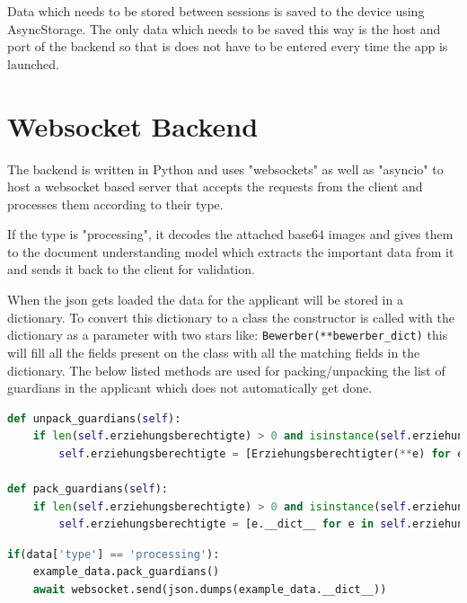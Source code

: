 Data which needs to be stored between sessions is saved to the device using AsyncStorage. The only data which needs to be saved this way is the host and port of the backend so that is does not have to be entered every time the app is launched.

\section{Websocket Backend}

The backend is written in Python and uses "websockets" as well as "asyncio" to host a websocket based server that accepts the requests from the client and processes them according to their type.

If the type is "processing", it decodes the attached base64 images and gives them to the document understanding model which extracts the important data from it and sends it back to the client for validation.

When the json gets loaded the data for the applicant will be stored in a dictionary. To convert this dictionary to a class the constructor is called with the dictionary as a parameter with two stars like: \lstinline{Bewerber(**bewerber_dict)} this will fill all the fields present on the class with all the matching fields in the dictionary. The below listed methods are used for packing/unpacking the list of guardians in the applicant which does not automatically get done.

\begin{lstlisting}[language=Python,caption=Packing of Guardians]
def unpack_guardians(self):
    if len(self.erziehungsberechtigte) > 0 and isinstance(self.erziehungsberechtigte[0], dict):
        self.erziehungsberechtigte = [Erziehungsberechtigter(**e) for e in self.erziehungsberechtigte]

def pack_guardians(self):
    if len(self.erziehungsberechtigte) > 0 and isinstance(self.erziehungsberechtigte[0], Erziehungsberechtigter):
        self.erziehungsberechtigte = [e.__dict__ for e in self.erziehungsberechtigte]
\end{lstlisting}

\begin{lstlisting}[language=Python,caption=Code for the processing of images,label=lst:impl:processingImages]
if(data['type'] == 'processing'):
    example_data.pack_guardians()
    await websocket.send(json.dumps(example_data.__dict__))
\end{lstlisting}

